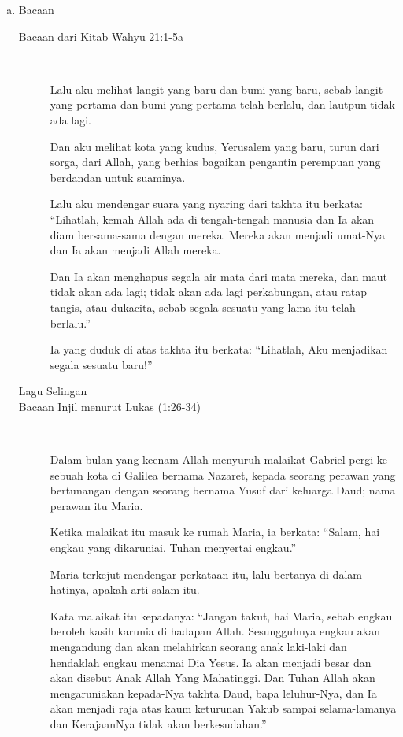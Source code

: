 \documentclass[a5paper,titlepage,12pt]{scrbook}
\begin{document}
\begin{itemize}
\begin{enumerate}[a.]
		\item Bacaan
			\begin{description}
				\item [Bacaan dari Kitab  Wahyu 21:1-5a] 
					{~}

					Lalu aku melihat langit yang baru dan bumi yang baru, sebab langit yang pertama dan bumi yang pertama telah berlalu, dan lautpun tidak ada lagi.
					
					Dan aku melihat kota yang kudus, Yerusalem yang baru, turun dari sorga, dari Allah, yang berhias bagaikan pengantin perempuan yang berdandan untuk suaminya.
					
					Lalu aku mendengar suara yang nyaring dari takhta itu berkata: ``Lihatlah, kemah Allah ada di tengah-tengah manusia dan Ia akan diam bersama-sama dengan mereka. Mereka akan menjadi umat-Nya dan Ia akan menjadi Allah mereka.
					
					Dan Ia akan menghapus segala air mata dari mata mereka, dan maut tidak akan ada lagi; tidak akan ada lagi perkabungan, atau ratap tangis, atau dukacita, sebab segala sesuatu yang lama itu telah berlalu.''
					
					Ia yang duduk di atas takhta itu berkata: ``Lihatlah, Aku menjadikan segala sesuatu baru!'' 

				\item [Lagu Selingan]

				\item [Bacaan Injil menurut Lukas (1:26-34)]
				{~}
				
				Dalam bulan yang keenam Allah menyuruh malaikat Gabriel pergi ke sebuah kota di Galilea bernama Nazaret,
				kepada seorang perawan yang bertunangan dengan seorang bernama Yusuf dari keluarga Daud; nama perawan itu Maria.
				
				Ketika malaikat itu masuk ke rumah Maria, ia berkata: ``Salam, hai engkau yang dikaruniai, Tuhan menyertai engkau.''
				
				Maria terkejut mendengar perkataan itu, lalu bertanya di dalam hatinya, apakah arti salam itu.
				
				Kata malaikat itu kepadanya: ``Jangan takut, hai Maria, sebab engkau beroleh kasih karunia di hadapan Allah.
				Sesungguhnya engkau akan mengandung dan akan melahirkan seorang anak laki-laki dan hendaklah engkau menamai Dia Yesus. Ia akan menjadi besar dan akan disebut Anak Allah Yang Mahatinggi. Dan Tuhan Allah akan mengaruniakan kepada-Nya takhta Daud, bapa leluhur-Nya, dan Ia akan menjadi raja atas kaum keturunan Yakub sampai selama-lamanya dan KerajaanNya tidak akan berkesudahan.''
				

\end{description}
\end{enumerate}
\end{itemize}
\end{document}
